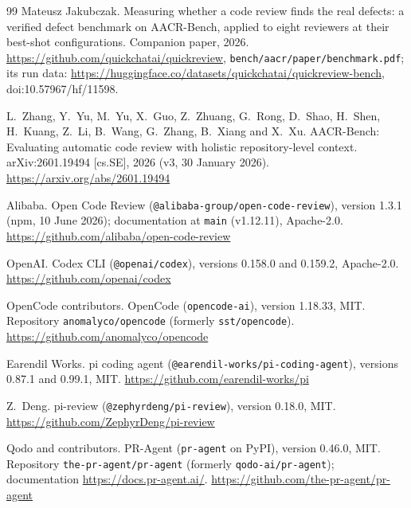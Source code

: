 \documentclass[11pt,a4paper]{article}
\newcommand{\code}[1]{\texttt{#1}}
\begin{document}
\small
\begin{thebibliography}{99}
Mateusz Jakubczak.
\newblock Measuring whether a code review finds the real defects: a verified
defect benchmark on AACR-Bench, applied to eight reviewers at their best-shot
configurations.
\newblock Companion paper, 2026.
\newblock \url{https://github.com/quickchatai/quickreview}, \code{bench/aacr/paper/benchmark.pdf};
its run data: \url{https://huggingface.co/datasets/quickchatai/quickreview-bench}, doi:10.57967/hf/11598. %

L.~Zhang, Y.~Yu, M.~Yu, X.~Guo, Z.~Zhuang, G.~Rong, D.~Shao, H.~Shen,
H.~Kuang, Z.~Li, B.~Wang, G.~Zhang, B.~Xiang and X.~Xu.
\newblock AACR-Bench: Evaluating automatic code review with holistic
repository-level context.
\newblock arXiv:2601.19494 [cs.SE], 2026 (v3, 30 January 2026).
\newblock \url{https://arxiv.org/abs/2601.19494}

Alibaba.
\newblock Open Code Review (\texttt{@alibaba-group/open-code-review}),
version 1.3.1 (npm, 10 June 2026); documentation at \texttt{main}
(v1.12.11), Apache-2.0.
\newblock \url{https://github.com/alibaba/open-code-review}

OpenAI.
\newblock Codex CLI (\texttt{@openai/codex}), versions 0.158.0 and 0.159.2,
Apache-2.0.
\newblock \url{https://github.com/openai/codex}

OpenCode contributors.
\newblock OpenCode (\texttt{opencode-ai}), version 1.18.33, MIT.
Repository \texttt{anomalyco/opencode} (formerly \texttt{sst/opencode}).
\newblock \url{https://github.com/anomalyco/opencode}

Earendil Works.
\newblock pi coding agent (\texttt{@earendil-works/pi-coding-agent}),
versions 0.87.1 and 0.99.1, MIT.
\newblock \url{https://github.com/earendil-works/pi}

Z.~Deng.
\newblock pi-review (\texttt{@zephyrdeng/pi-review}), version 0.18.0, MIT.
\newblock \url{https://github.com/ZephyrDeng/pi-review}

Qodo and contributors.
\newblock PR-Agent (\texttt{pr-agent} on PyPI), version 0.46.0, MIT.
Repository \texttt{the-pr-agent/pr-agent} (formerly
\texttt{qodo-ai/pr-agent}); documentation \url{https://docs.pr-agent.ai/}.
\newblock \url{https://github.com/the-pr-agent/pr-agent}


\end{thebibliography}
\end{document}

